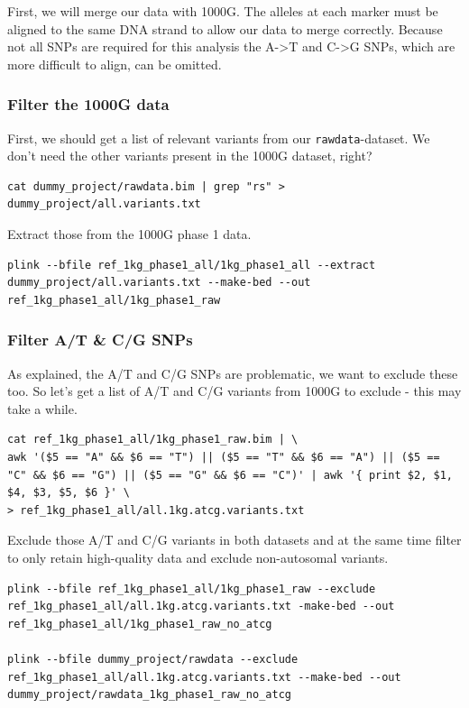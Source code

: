 \documentclass[
]{book}
\newcommand{\passthrough}[1]{#1}
\begin{document}
First, we will merge our data with 1000G. The alleles at each marker must be aligned to the same DNA strand to allow our data to merge correctly. Because not all SNPs are required for this analysis the A-\textgreater T and C-\textgreater G SNPs, which are more difficult to align, can be omitted.

\hypertarget{filter-the-1000g-data}{%
\subsubsection{Filter the 1000G data}\label{filter-the-1000g-data}}

First, we should get a list of relevant variants from our \passthrough{\lstinline!rawdata!}-dataset. We don't need the other variants present in the 1000G dataset, right?

\begin{lstlisting}
cat dummy_project/rawdata.bim | grep "rs" > dummy_project/all.variants.txt
\end{lstlisting}

Extract those from the 1000G phase 1 data.

\begin{lstlisting}
plink --bfile ref_1kg_phase1_all/1kg_phase1_all --extract dummy_project/all.variants.txt --make-bed --out ref_1kg_phase1_all/1kg_phase1_raw
\end{lstlisting}

\hypertarget{filter-at-cg-snps}{%
\subsubsection{Filter A/T \& C/G SNPs}\label{filter-at-cg-snps}}

As explained, the A/T and C/G SNPs are problematic, we want to exclude these too. So let's get a list of A/T and C/G variants from 1000G to exclude - this may take a while.

\begin{lstlisting}
cat ref_1kg_phase1_all/1kg_phase1_raw.bim | \
awk '($5 == "A" && $6 == "T") || ($5 == "T" && $6 == "A") || ($5 == "C" && $6 == "G") || ($5 == "G" && $6 == "C")' | awk '{ print $2, $1, $4, $3, $5, $6 }' \
> ref_1kg_phase1_all/all.1kg.atcg.variants.txt
\end{lstlisting}

Exclude those A/T and C/G variants in both datasets and at the same time filter to only retain high-quality data and exclude non-autosomal variants.

\begin{lstlisting}
plink --bfile ref_1kg_phase1_all/1kg_phase1_raw --exclude ref_1kg_phase1_all/all.1kg.atcg.variants.txt -make-bed --out ref_1kg_phase1_all/1kg_phase1_raw_no_atcg

plink --bfile dummy_project/rawdata --exclude ref_1kg_phase1_all/all.1kg.atcg.variants.txt --make-bed --out dummy_project/rawdata_1kg_phase1_raw_no_atcg
\end{lstlisting}
\end{document}
